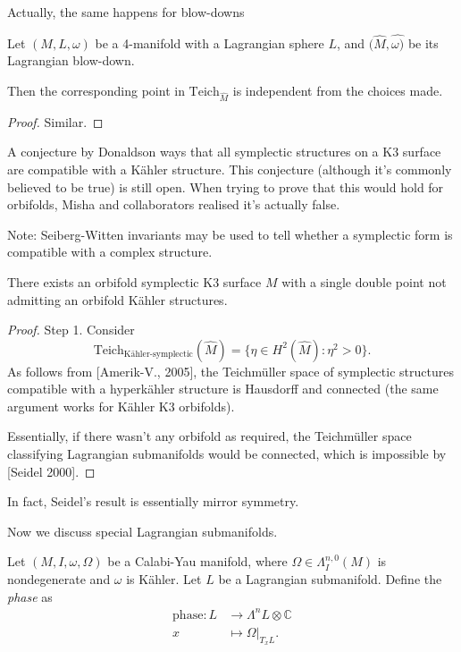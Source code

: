 \noindent
Actually, the same happens for blow-downs

\begin{theorem}
\label{theorem-same-for-blow-down}
Let $(M,L,\omega)$ be a 4-manifold with a
Lagrangian sphere $L$, and
$(\hat{M},\hat{\omega)}$ be its Lagrangian
blow-down.

Then the corresponding point in
$\text{Teich}_{\hat{M}}$ is
independent from the choices made.
\end{theorem}

\begin{proof}
Similar.
\end{proof}

\medskip\noindent
A conjecture by Donaldson ways that all
symplectic structures on a K3
surface are compatible with a Kähler
structure. This conjecture
(although it's commonly believed to be true)
is still open.
When trying to prove that this would hold for
orbifolds,
Misha and collaborators realised it's
actually false.

Note: Seiberg-Witten invariants may be used
to tell whether a symplectic
form is compatible with a complex structure.

\begin{theorem}
\label{theorem-conje-false-orbif}
There exists an orbifold symplectic K3
surface $M$ with a single
double point not admitting an orbifold Kähler
structures.
\end{theorem}

\begin{proof}
\noindent
Step 1. Consider
$$
\text{Teich}_{\text{Kähler-symplectic}}
(\hat{M})
=\{\eta \in H^{2}(\hat{M}):\eta^2>0\}.
$$
As follows from [Amerik-V., 2005], the
Teichmüller space of symplectic structures
compatible
with a hyperkähler structure is Hausdorff and
connected
(the same argument works for Kähler K3
orbifolds).

Essentially, if there wasn't any orbifold
as required, the Teichmüller space
classifying
Lagrangian submanifolds would be connected,
which
is impossible by [Seidel 2000].
\end{proof}

\noindent
In fact, Seidel's result is essentially
mirror symmetry.

\medskip\noindent
Now we discuss special Lagrangian
submanifolds.

\begin{definition}
\label{definition-phase}
Let $(M,I,\omega,\Omega)$ be a Calabi-Yau
manifold, where
$\Omega \in \Lambda^{n,0}_I(M)$ is
nondegenerate and $\omega$ is Kähler.
Let $L$ be a Lagrangian submanifold.
Define the {\it phase} as
$$
\begin{aligned}
\text{phase}: L &\longrightarrow \Lambda^nL
\otimes \mathbb{C} \\
x &\longmapsto \Omega|_{T_xL}.
\end{aligned}
$$
\end{definition}

